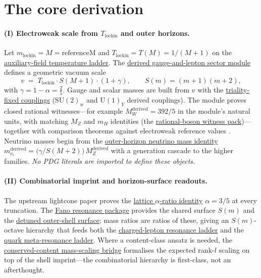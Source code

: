 \documentclass[11pt]{article}
\begin{document}
\section{The core derivation}
\label{sec:core}

\paragraph{(I) Electroweak scale from $T_{\mathrm{lockin}}$ and outer horizons.}
Let $m_{\mathrm{lockin}}=M=\mathrm{referenceM}$ and
$T_{\mathrm{lockin}}=T(M)=1/(M+1)$ on the
\hyperref[lean:auxiliary-T]{auxiliary-field temperature ladder}.
The
\hyperref[lean:gauge-lepton]{derived gauge-and-lepton sector
module} defines a geometric vacuum scale
\[
  v \;=\; T_{\mathrm{lockin}}\cdot S(M+1)\cdot(1+\gamma),
  \qquad S(m)=(m+1)(m+2),
\]
with $\gamma=1-\alpha=\tfrac{2}{5}$. Gauge and scalar masses are
built from $v$ with the
\hyperref[lean:gauge-couplings]{triality-fixed couplings}
($\mathrm{SU}(2)_w$ and $\mathrm{U}(1)_Y$ derived couplings).
The module proves closed rational witnesses---for example
$M_W^{\mathrm{derived}}=392/5$ in the module's natural units, with
matching $M_Z$ and $m_H$ identities (the
\hyperref[lean:boson-witnesses]{rational-boson witness pack})---
together with comparison theorems against electroweak reference
values \cite{pdg2024}. Neutrino masses begin from the
\hyperref[lean:neutrino-ladder]{outer-horizon neutrino mass
identity}
\(
  m_{\nu_e}^{\mathrm{derived}}=\bigl(\gamma/S(M+2)\bigr)\,M_Z^{\mathrm{derived}}
\)
with a generation cascade to the higher families. \emph{No PDG
literals are imported to define these objects.}

\paragraph{(II) Combinatorial imprint and horizon-surface readouts.}
The upstream lightcone paper \cite{hqiv-lightcone-paper} proves
the
\hyperref[lean:alpha-ratio]{lattice $\alpha$-ratio identity}
$\alpha=3/5$ at every truncation. The
\hyperref[lean:fano-resonance]{Fano resonance package} provides
the shared surface $S(m)$ and the
\hyperref[lean:detuned-shell]{detuned outer-shell surface}; mass
ratios are ratios of these, giving an $S(m)$-octave hierarchy that
feeds both the
\hyperref[lean:lepton-resonance]{charged-lepton resonance ladder}
and the
\hyperref[lean:quark-meta]{quark meta-resonance ladder}. Where a
content-class ansatz is needed, the
\hyperref[lean:content-mass-bridge]{conserved-content
mass-scaling bridge} formalises the expected rank-$l$ scaling on
top of the shell imprint---the combinatorial hierarchy is
first-class, not an afterthought.
\end{document}
